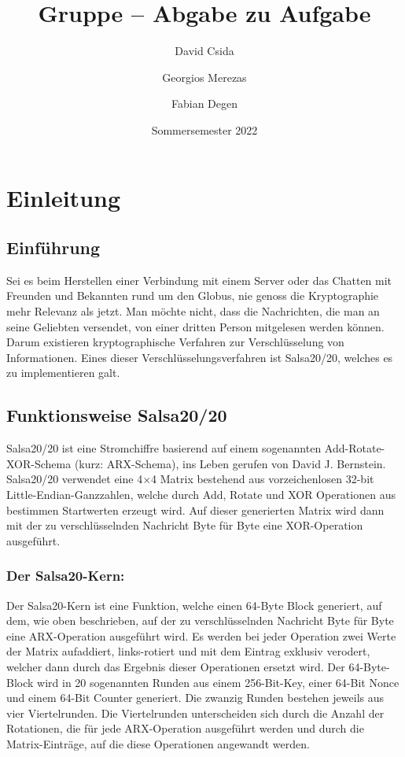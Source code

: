 \documentclass[course=erap]{aspdoc}
\author{David Csida \and Georgios Merezas \and Fabian Degen}
\date{Sommersemester 2022} %
\title{Gruppe \theGroup{} -- Abgabe zu Aufgabe \theNumber}
\begin{document}
\maketitle

\section{Einleitung}
\subsection{Einführung}
Sei es beim Herstellen einer Verbindung mit einem Server oder das Chatten mit Freunden und Bekannten rund um 
den Globus, nie genoss die Kryptographie mehr Relevanz als jetzt. Man möchte nicht, dass die Nachrichten, 
die man an seine Geliebten versendet, von einer dritten Person mitgelesen werden können. Darum existieren 
kryptographische Verfahren zur Verschlüsselung von Informationen. Eines dieser Verschlüsselungsverfahren ist 
Salsa20/20, welches es zu implementieren galt.

\subsection{Funktionsweise Salsa20/20}
Salsa20/20 ist eine Stromchiffre basierend auf einem sogenannten Add-Rotate-XOR-Schema (kurz: ARX-Schema), ins Leben gerufen von 
David J. Bernstein.
\\Salsa20/20 verwendet eine 4$\times$4 Matrix bestehend aus vorzeichenlosen 32-bit Little-Endian-Ganzzahlen, 
welche durch Add, Rotate und XOR Operationen aus bestimmen Startwerten erzeugt wird.
Auf dieser generierten Matrix wird dann mit der zu verschlüsselnden Nachricht Byte für Byte eine XOR-Operation ausgeführt.

\subsubsection{Der Salsa20-Kern:}
Der Salsa20-Kern ist eine Funktion, welche einen 64-Byte Block generiert, auf dem, wie oben beschrieben, auf 
der zu verschlüsselnden Nachricht Byte für Byte eine ARX-Operation ausgeführt wird. Es werden bei jeder Operation 
zwei Werte der Matrix aufaddiert, links-rotiert und mit dem Eintrag exklusiv verodert, welcher dann durch das Ergebnis 
dieser Operationen ersetzt wird. 
Der 64-Byte-Block wird in 20 sogenannten Runden aus einem 256-Bit-Key, einer 64-Bit Nonce und einem 64-Bit 
Counter generiert. Die zwanzig Runden bestehen jeweils aus vier Viertelrunden. Die Viertelrunden unterscheiden sich 
durch die Anzahl der Rotationen, die für jede ARX-Operation ausgeführt werden und durch die Matrix-Einträge, auf die 
diese Operationen angewandt werden.
\end{document}
